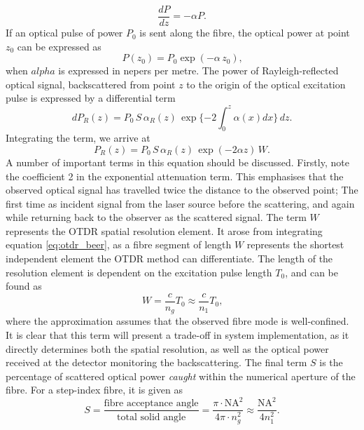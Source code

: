 \documentclass{standalone}
\begin{document}
\begin{equation}
\frac{dP}{dz} = -\alpha P \textrm{.}
\end{equation}
If an optical pulse of power $P_0$ is sent along the fibre, the optical power at point $z_0$ can be expressed as
\begin{equation}
P(z_0) = P_0 \exp\left(-\alpha \, z_0\right) \textrm{,}
\end{equation}
when $alpha$ is expressed in nepers per metre. The power of Rayleigh-reflected optical signal, backscattered from point $z$ to the origin of the optical excitation pulse is expressed by a differential term
\begin{equation} \label{eq:otdr_beer}
dP_R(z) = P_0 \, S \, \alpha_R(z) \, \exp\{ -2 \int_{0}^{z} \alpha(x) dx \} \, dz \textrm{.}
\end{equation}
Integrating the term, we arrive at
\begin{equation} \label{eq:otdr_power}
P_R(z) = P_0 \, S \, \alpha_R(z) \, \exp\left(-2 \alpha z\right) \, W \textrm{.}
\end{equation}
A number of important terms in this equation should be discussed. Firstly, note the coefficient 2 in the exponential attenuation term. This emphasises that the observed optical signal has travelled twice the distance to the observed point; The first time as incident signal from the laser source before the scattering, and again while returning back to the observer as the scattered signal. The term $W$ represents the OTDR spatial resolution element. It arose from integrating equation \ref{eq:otdr_beer}, as a fibre segment of length $W$ represents the shortest independent element the OTDR method can differentiate. The length of the resolution element is dependent on the excitation pulse length $T_0$, and can be found as
\begin{equation} \label{eq:otdr_resolution}
W = \frac{c}{n_g} T_0 \approx \frac{c}{n_1} T_0 \textrm{,}
\end{equation}
where the approximation assumes that the observed fibre mode is well-confined. It is clear that this term will present a trade-off in system implementation, as it directly determines both the spatial resolution, as well as the optical power received at the detector monitoring the backscattering. The final term $S$ is the percentage of scattered optical power \textit{caught} within the numerical aperture of the fibre. For a step-index fibre, it is given as
\begin{equation}
S = \frac{\textrm{fibre acceptance angle}}{\textrm{total solid angle}} = \frac{\pi \cdot \textrm{NA}^2}{4 \pi \cdot n_g^2} \approx \frac{\textrm{NA}^2}{4n_1^2} \textrm{.}
\end{equation}
\end{document}
